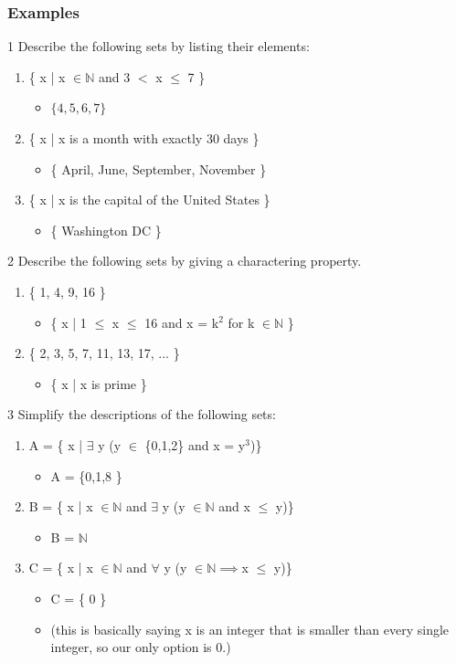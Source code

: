 \documentclass[12pt, letterpaper]{article}
\newcommand{\exheader}[1][ex]{{\tiny{#1}\normalsize}}
\begin{document}
\subsubsection{Examples}
\exheader[1] Describe the following sets by listing their elements:
\begin{enumerate}
	\item \{ x | x $\in \mathbb{N}$ and 3 $<$ x $\le$ 7 \}
	\begin{itemize}[label={\faAngleRight}]
		\item   $\{ 4,5,6,7 \}$
	\end{itemize}
	\item \{ x | x  is a month with exactly 30 days \}
	\begin{itemize}[label={\faAngleRight}]
		\item   \{ April, June, September, November \}
	\end{itemize}
	\item \{ x | x is the capital of the United States \}
	\begin{itemize}[label={\faAngleRight}]
		\item \{ Washington DC \}
	\end{itemize}
\end{enumerate}
\bigbreak
\exheader[2] Describe the following sets by giving a charactering property.
\begin{enumerate}
	\item \{ 1, 4, 9, 16 \}
	\begin{itemize}[label={\faAngleRight}]
		\item \{ x | 1 $\le$ x $\le$ 16 and x = k$^2$ for k $\in \mathbb{N}$ \}
	\end{itemize}
	\item \{ 2, 3, 5, 7, 11, 13, 17, ... \} 
	\begin{itemize}[label={\faAngleRight}]
		\item \{ x | x is prime \}
	\end{itemize}
\end{enumerate}
\bigbreak
\exheader[3] Simplify the descriptions of the following sets:
\begin{enumerate}
	\item A = \{ x | $\exists$ y (y $\in$ \{0,1,2\} and x = y$^3$)\}
	\begin{itemize}
		\item A = \{0,1,8 \}
	\end{itemize}
	\item  B = \{ x | x $\in \mathbb{N}$ and $\exists$ y (y $\in \mathbb{N}$ and x $\le$ y)\}
	\begin{itemize}
		\item B = $\mathbb{N}$
	\end{itemize}
	\item C = \{  x | x $\in \mathbb{N}$ and $\forall$ y (y $\in \mathbb{N} \implies $x $\le$ y)\}
	\begin{itemize}
		\item C = \{ 0 \}
		\item (this is basically saying x is an integer that is smaller than every single integer, so our only option is 0.)
	\end{itemize}
\end{enumerate}
\end{document}
